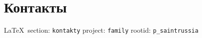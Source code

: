  
 
\section{Контакты}
\url{}
  
\vspace{0.5cm}
 {\ifDEBUG\small\LaTeX~section: \verb|kontakty| project: \verb|family| rootid: \verb|p_saintrussia| \fi}
\vspace{0.5cm}
  
